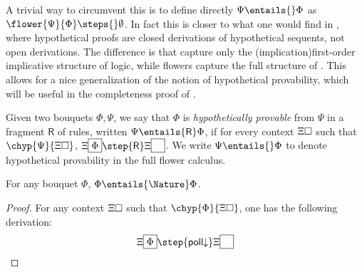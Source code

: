 A trivial way to circumvent this is to define directly $\Psi \entails{} \Phi$ as
$\flower{\Psi}{\Phi} \steps{} \emptyset$. In fact this is closer to what one
would find in , where hypothetical proofs are closed
derivations of hypothetical sequents, not open derivations. The difference is
that  capture only the \intro(implication){first-order} implicative
structure of logic, while flowers capture the full structure
of  . This allows for a nice
generalization of the notion of hypothetical provability, which will be useful
in the completeness proof of . 

\begin{definition}
  Given two bouquets $\Phi, \Psi$, we say that $\Phi$ is \emph{hypothetically
  provable} from $\Psi$ in a fragment $\mathsf{R}$ of rules, written $\Psi
  \entails{\mathsf{R}} \Phi$, if for every context $\Xi\square$ such that
  $\chyp{\Psi}{\Xi\hole}$, $\cfill{\Xi}{\Phi} \step{\mathsf{R}}
  \cfill{\Xi}{\phantom{\Phi}}$. We write $\Psi \entails{} \Phi$ to denote
  hypothetical provability in the full flower calculus.
\end{definition}

\begin{lemma}[Reflexivity]
  For any bouquet $\Phi$, $\Phi \entails{\Nature} \Phi$.
\end{lemma}
\begin{proof}
  For any context $\Xi\square$ such that $\chyp{\Phi}{\Xi\hole}$, one has the following
  derivation:
  $$
  \cfill{\Xi}{\Phi} \step{\mathsf{poll{\da}}}
  \cfill{\Xi}{\phantom{\Phi}}
  $$
\end{proof}

